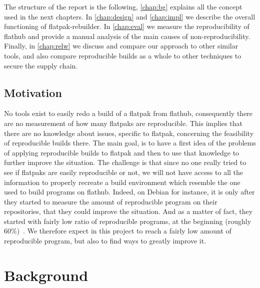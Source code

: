 \documentclass[a4paper,11pt,oneside]{report}
\theoremstyle{definition}
\newcommand{\sysname}{flatpak-rebuilder\xspace}
\newcommand{\rb}{reproducible builds\xspace}
\newcommand{\fp}{flatpak\xspace}
\newcommand{\fh}{flathub\xspace}
\begin{document}
The structure of the report is the following, \autoref{chap:bg} explains all
the concept used in the next chapters. In \autoref{chap:design} and
\autoref{chap:impl} we describe the overall functioning of \sysname. In
\autoref{chap:eval} we measure the reproducibility of \fh and provide a manual
analysis of the main causes of non-reproducibility. Finally, in
\autoref{chap:relw} we discuss and compare our approach to other similar tools,
and also compare \rb as a whole to other techniques to secure the supply chain.

\section{Motivation}
No tools exist to easily redo a build of a \fp from \fh, consequently there are
no measurement of how many flatpaks are reproducible. This implies that there
are no knowledge about issues, specific to \fp, concerning the feasibility of
\rb there. The main goal, is to have a first idea of the problems of applying
\rb to \fp and then to use that knowledge to further improve the situation. The
challenge is that since no one really tried to see if flatpaks are easily
reproducible or not, we will not have access to all the information to properly
recreate a build environment which resemble the one used to build programs on
\fh. Indeed, on Debian for instance, it is only after they started to measure
the amount of reproducible program on their repositories, that they could
improve the situation. And as a matter of fact, they started with fairly low
ratio of reproducible programs, at the beginning (roughly
60\%)~\cite{debian:repro}. We therefore expect in this project to reach a
fairly low amount of reproducible program, but also to find ways to greatly
improve it.


\chapter{Background}
\label{chap:bg}
\end{document}
